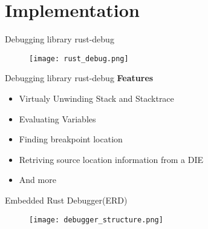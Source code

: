 \section{Implementation}

\begin{frame}{Debugging library rust-debug}
	\begin{figure}
		\texttt{[image: rust\_debug.png]}
	\end{figure}
\end{frame}


\begin{frame}{Debugging library rust-debug}
	\textbf{Features}
    \begin{itemize}
        \item Virtualy Unwinding Stack and Stacktrace
        \item Evaluating Variables
        \item Finding breakpoint location
        \item Retriving source location information from a DIE
        \item And more
    \end{itemize}
\end{frame}


\begin{frame}{Embedded Rust Debugger(ERD)}
	\begin{figure}
		\texttt{[image: debugger\_structure.png]}
	\end{figure}
\end{frame}




